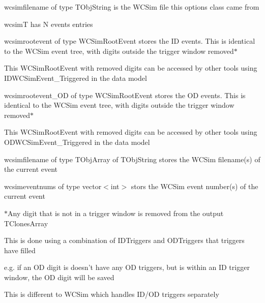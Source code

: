 \begin{DoxyItemize}
\begin{DoxyEnumerate}
{\ttfamily wcsimfilename} of type {\ttfamily T\-Obj\-String} is the W\-C\-Sim file this options class came from
\item {\ttfamily wcsim\-T} has N events entries
\begin{DoxyItemize}
\item {\ttfamily wcsimrootevent} of type {\ttfamily W\-C\-Sim\-Root\-Event} stores the I\-D events. This is identical to the W\-C\-Sim event tree, with digits outside the trigger window removed$\ast$
\begin{DoxyItemize}
\item This {\ttfamily W\-C\-Sim\-Root\-Event} with removed digits can be accessed by other tools using {\ttfamily I\-D\-W\-C\-Sim\-Event\-\_\-\-Triggered} in the data model
\end{DoxyItemize}
\item {\ttfamily wcsimrootevent\-\_\-\-O\-D} of type {\ttfamily W\-C\-Sim\-Root\-Event} stores the O\-D events. This is identical to the W\-C\-Sim event tree, with digits outside the trigger window removed$\ast$
\begin{DoxyItemize}
\item This {\ttfamily W\-C\-Sim\-Root\-Event} with removed digits can be accessed by other tools using {\ttfamily O\-D\-W\-C\-Sim\-Event\-\_\-\-Triggered} in the data model
\end{DoxyItemize}
\item {\ttfamily wcsimfilename} of type {\ttfamily T\-Obj\-Array} of {\ttfamily T\-Obj\-String} stores the W\-C\-Sim filename(s) of the current event
\item {\ttfamily wcsimeventnums} of type {\ttfamily vector$<$int$>$} stors the W\-C\-Sim event number(s) of the current event
\end{DoxyItemize}
\end{DoxyEnumerate}
\item $\ast$\-Any digit that is not in a trigger window is removed from the output {\ttfamily T\-Clones\-Array}
\begin{DoxyItemize}
\item This is done using a combination of {\ttfamily I\-D\-Triggers} and {\ttfamily O\-D\-Triggers} that triggers have filled
\begin{DoxyItemize}
\item e.\-g. if an O\-D digit is doesn't have any O\-D triggers, but is within an I\-D trigger window, the O\-D digit will be saved
\item This is different to W\-C\-Sim which handles I\-D/\-O\-D triggers separately

\end{DoxyItemize}
\end{DoxyItemize}
\end{DoxyItemize}
